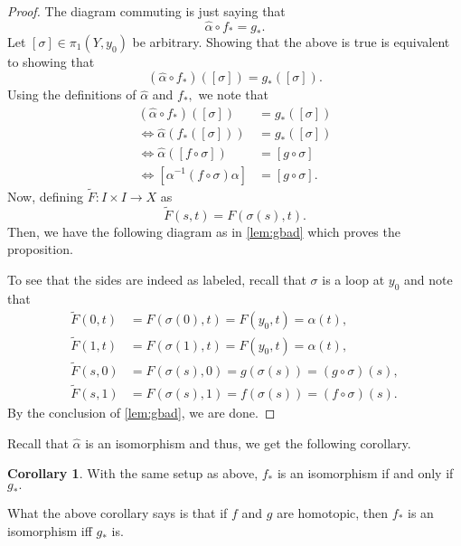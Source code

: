 \documentclass[12pt]{article}
\theoremstyle{definition}
\numberwithin{thm}{section}
\newtheorem{cor}[thm]{Corollary}
\begin{document}
\begin{proof} 
	The diagram commuting is just saying that
	\begin{equation*} 
		\widehat{\alpha} \circ f_* = g_*.
	\end{equation*}
	Let $[\sigma] \in \pi_1(Y, y_0)$ be arbitrary. Showing that the above is true is equivalent to showing that 
	\begin{equation*} 
		(\widehat{\alpha} \circ f_*)([\sigma]) = g_*([\sigma]).
	\end{equation*}
	Using the definitions of $\widehat{\alpha}$ and $f_*,$ we note that
	\begin{align*} 
		(\widehat{\alpha} \circ f_*)([\sigma]) &= g_*([\sigma])\\
		\iff \widehat{\alpha}(f_*([\sigma])) &= g_*([\sigma])\\
		\iff \widehat{\alpha}([f\circ \sigma]) &= [g\circ \sigma]\\
		\iff [\alpha^{-1}(f\circ \sigma) \alpha] &= [g\circ \sigma].
	\end{align*}
	Now, defining $\tilde{F}:I\times I \to X$ as
	\begin{equation*} 
		\tilde{F}(s, t) = F(\sigma(s), t).
	\end{equation*}
	Then, we have the following diagram as in \cref{lem:gbad} which proves the proposition.
	\begin{center}
	\end{center}
	To see that the sides are indeed as labeled, recall that $\sigma$ is a loop at $y_0$ and note that
	\begin{align*} 
		\tilde{F}(0, t) &= F(\sigma(0), t) = F(y_0, t) = \alpha(t),\\
		\tilde{F}(1, t) &= F(\sigma(1), t) = F(y_0, t) = \alpha(t),\\
		\tilde{F}(s, 0) &= F(\sigma(s), 0) = g(\sigma(s)) = (g\circ \sigma)(s),\\
		\tilde{F}(s, 1) &= F(\sigma(s), 1) = f(\sigma(s)) = (f\circ \sigma)(s).
	\end{align*}
	By the conclusion of \cref{lem:gbad}, we are done.
\end{proof}
Recall that $\widehat{\alpha}$ is an isomorphism and thus, we get the following corollary.
\begin{cor} \label{cor:homsameiso}
	With the same setup as above, $f_*$ is an isomorphism if and only if $g_*.$
\end{cor}
What the above corollary says is that if $f$ and $g$ are homotopic, then $f_*$ is an isomorphism iff $g_*$ is.
\end{document}
